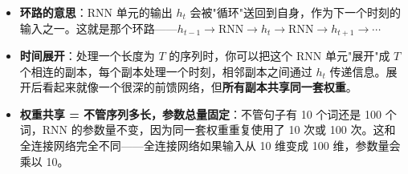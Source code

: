 \documentclass[a4paper,11pt]{ctexart}
\begin{document}
\begin{beginnerbox}
    \begin{itemize}
        \item \textbf{环路的意思}：RNN 单元的输出 $h_t$ 会被"循环"送回到自身，作为下一个时刻的输入之一。这就是那个环路——$h_{t-1} \to \text{RNN} \to h_t \to \text{RNN} \to h_{t+1} \to \cdots$
        \item \textbf{时间展开}：处理一个长度为 $T$ 的序列时，你可以把这个 RNN 单元"展开"成 $T$ 个相连的副本，每个副本处理一个时刻，相邻副本之间通过 $h_t$ 传递信息。展开后看起来就像一个很深的前馈网络，但\textbf{所有副本共享同一套权重}。
        \item \textbf{权重共享 = 不管序列多长，参数总量固定}：不管句子有 10 个词还是 100 个词，RNN 的参数量不变，因为同一套权重重复使用了 10 次或 100 次。这和全连接网络完全不同——全连接网络如果输入从 10 维变成 100 维，参数量会乘以 10。
    \end{itemize}
\end{beginnerbox}
\end{document}
